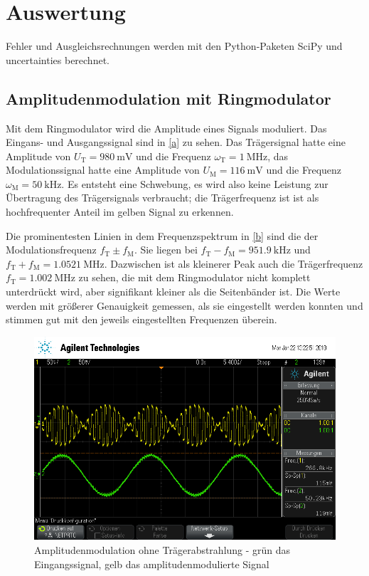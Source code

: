 \section{Auswertung}

Fehler und Ausgleichsrechnungen werden mit den Python-Paketen SciPy \cite{scipy} und uncertainties \cite{uncertain} berechnet.

\subsection{Amplitudenmodulation mit Ringmodulator}

Mit dem Ringmodulator wird die Amplitude eines Signals moduliert. Das Eingans- und Ausgangssignal sind in \autoref{a} zu sehen. Das Trägersignal hatte eine Amplitude von $U_\text{T}=\SI{980}{\milli\volt}$ und die Frequenz $\omega_\text{T}=\SI{1}{\mega\hertz}$, das Modulationssignal hatte eine Amplitude von $U_\text{M}=\SI{116}{\milli\volt}$ und die Frequenz $\omega_\text{M}=\SI{50}{\kilo\hertz}$. Es entsteht eine Schwebung, es wird also keine Leistung zur Übertragung des Trägersignals verbraucht; die Trägerfrequenz ist ist als hochfrequenter Anteil im gelben Signal zu erkennen. \par
\indent Die prominentesten Linien in dem Frequenzspektrum in \autoref{b} sind die der Modulationsfrequenz $f_\text{T} \pm f_\text{M}$. Sie liegen bei $f_\text{T} - f_\text{M} = \SI{951.9}{\kilo\hertz}$ und $f_\text{T} + f_\text{M} = \SI{1.0521}{\mega\hertz}$. Dazwischen ist als kleinerer Peak auch die Trägerfrequenz $f_\text{T} = \SI{1.002}{\mega\hertz}$ zu sehen, die mit dem Ringmodulator nicht komplett unterdrückt wird, aber signifikant kleiner als die Seitenbänder ist. Die Werte werden mit größerer Genauigkeit gemessen, als sie eingestellt werden konnten und stimmen gut mit den jeweils eingestellten Frequenzen überein. \par

\begin{figure}
	\centering
	\includegraphics[width=\textwidth]{img/a_scope_230.png}
	\caption{Amplitudenmodulation ohne Trägerabstrahlung - grün das Eingangssignal, gelb das amplitudenmodulierte Signal}
	\label{a}
\end{figure}

